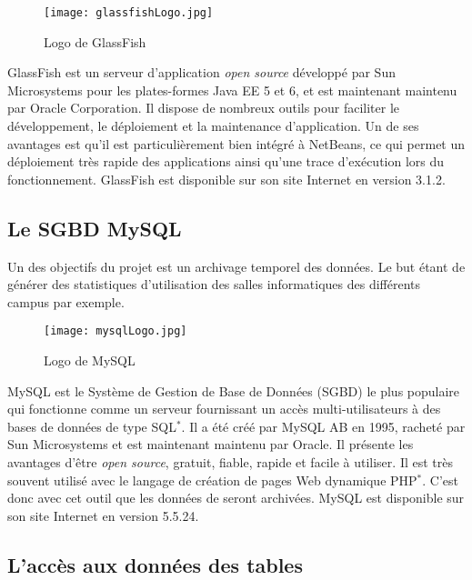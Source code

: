\begin{figure}[!ht]
	\centering
	\texttt{[image: glassfishLogo.jpg]}
	\caption{Logo de GlassFish}

\end{figure}

GlassFish est un serveur d'application \textit{open source} d\'evelopp\'e par Sun Microsystems pour les plates-formes Java EE 5 et 6, et est maintenant maintenu par Oracle Corporation.
Il dispose de nombreux outils pour faciliter le d\'eveloppement, le d\'eploiement et la maintenance d'application.
Un de ses avantages est qu'il est particuli\`erement bien int\'egr\'e \`a NetBeans, ce qui permet un d\'eploiement tr\`es rapide des applications ainsi qu'une trace d'ex\'ecution lors du fonctionnement.
GlassFish est disponible sur son site Internet\cite{biblio:siteGlassfish} en version 3.1.2.

\subsection{Le SGBD MySQL}

Un des objectifs du projet {\YuukouII} est un archivage temporel des donn\'ees.
Le but \'etant de g\'en\'erer des statistiques d'utilisation des salles informatiques des diff\'erents campus par exemple.

\begin{figure}[!ht]
	\centering
	\texttt{[image: mysqlLogo.jpg]}
	\caption{Logo de MySQL}
	
\end{figure}

MySQL est le Syst\`eme de Gestion de Base de Donn\'ees (SGBD) le plus populaire qui fonctionne comme un serveur fournissant un acc\`es multi-utilisateurs \`a des bases de donn\'ees de type SQL$^*$.
Il a \'et\'e cr\'e\'e par MySQL AB en 1995, rachet\'e par Sun Microsystems et est maintenant maintenu par Oracle.
Il pr\'esente les avantages d'\^etre \textit{open source}, gratuit, fiable, rapide et facile \`a utiliser.
Il est tr\`es souvent utilis\'e avec le langage de cr\'eation de pages Web dynamique PHP$^*$.
C'est donc avec cet outil que les donn\'ees de {\YuukouII} seront archiv\'ees.
MySQL est disponible sur son site Internet\cite{biblio:siteMySQL} en version 5.5.24.

\subsection{L'acc\`es aux donn\'ees des tables}

